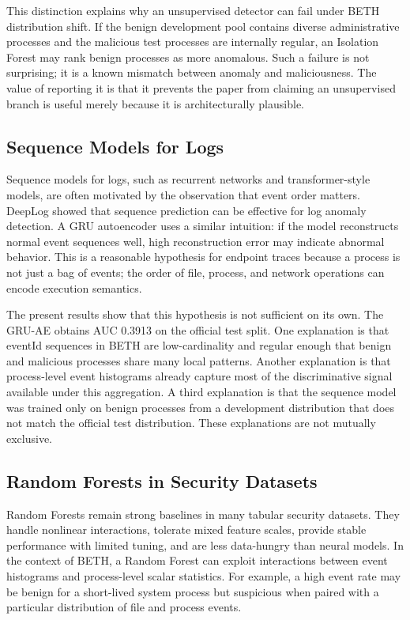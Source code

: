 \documentclass[journal]{IEEEtran}
\begin{document}
This distinction explains why an unsupervised detector can fail under BETH distribution shift. If the benign development pool contains diverse administrative processes and the malicious test processes are internally regular, an Isolation Forest may rank benign processes as more anomalous. Such a failure is not surprising; it is a known mismatch between anomaly and maliciousness. The value of reporting it is that it prevents the paper from claiming an unsupervised branch is useful merely because it is architecturally plausible.

\subsection{Sequence Models for Logs}

Sequence models for logs, such as recurrent networks and transformer-style models, are often motivated by the observation that event order matters. DeepLog \cite{du2017} showed that sequence prediction can be effective for log anomaly detection. A GRU autoencoder uses a similar intuition: if the model reconstructs normal event sequences well, high reconstruction error may indicate abnormal behavior. This is a reasonable hypothesis for endpoint traces because a process is not just a bag of events; the order of file, process, and network operations can encode execution semantics.

The present results show that this hypothesis is not sufficient on its own. The GRU-AE obtains AUC 0.3913 on the official test split. One explanation is that eventId sequences in BETH are low-cardinality and regular enough that benign and malicious processes share many local patterns. Another explanation is that process-level event histograms already capture most of the discriminative signal available under this aggregation. A third explanation is that the sequence model was trained only on benign processes from a development distribution that does not match the official test distribution. These explanations are not mutually exclusive.

\subsection{Random Forests in Security Datasets}

Random Forests \cite{breiman2001} remain strong baselines in many tabular security datasets. They handle nonlinear interactions, tolerate mixed feature scales, provide stable performance with limited tuning, and are less data-hungry than neural models. In the context of BETH, a Random Forest can exploit interactions between event histograms and process-level scalar statistics. For example, a high event rate may be benign for a short-lived system process but suspicious when paired with a particular distribution of file and process events.
\end{document}
